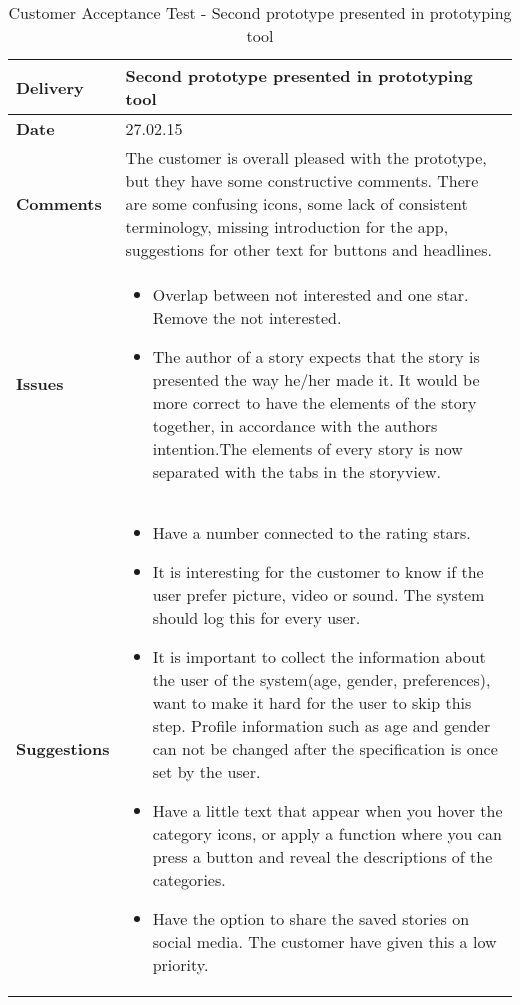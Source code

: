 			\renewcommand{\arraystretch}{2}%
			\begin{center}
				\begin{longtable}{ | p{4cm} | p{13cm} | }
					
					\caption[Customer Acceptance test]{Customer Acceptance Test - Second prototype presented in prototyping tool} \label{Tab:cattest2}\\
					\hline
					\textbf{Delivery} & Second prototype presented in prototyping tool\\ \hline
					\textbf{Date} & 27.02.15 \\ \hline 
					\textbf{Comments}&
					The customer is overall pleased with the prototype, but they have some constructive comments. 
					There are some confusing icons, some lack of consistent terminology, missing introduction for the app, suggestions for other text for buttons and headlines.
					\\ \hline
					\textbf{Issues} 	 &	 	 	 	
					\begin{itemize}[noitemsep]
						\item Overlap between not interested and one star. Remove the not interested.
						\item The author of a story expects that the story is presented the way he/her made it. It would be more correct to have the elements of the story together, in accordance with the authors intention.The elements of every story is now separated with the tabs in the storyview. 
					\end{itemize}
					\\ \hline
					\textbf{Suggestions} &
					\begin{itemize}[noitemsep]
						\item Have a number connected to the rating stars.
						\item It is interesting for the customer to know if the user prefer picture, video or sound. The system should log this for every user. 
						\item 	It is important to collect the information about the user of the system(age, gender, preferences), want to make it hard for the user to skip this step. Profile information such as age and gender can not be changed after the specification is once set by the user. 
						\item Have a little text that appear when you hover the category icons, or apply a function where you can press a button and reveal the descriptions of the categories. \newline
						\item Have the option to share the saved stories on social media. The customer have given this a low priority.
					\end{itemize}
					\\ \hline
				\end{longtable}
			\end{center}
			
